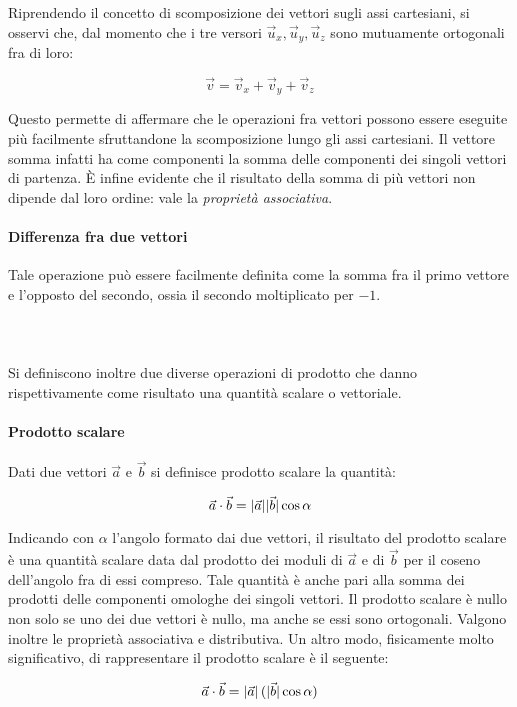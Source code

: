 Riprendendo il concetto di scomposizione dei vettori sugli assi cartesiani, si osservi che, dal momento che i tre versori $\vec{u}_x, \vec{u}_y, \vec{u}_z$ sono mutuamente ortogonali fra di loro:

\[
	\vec{v}=\vec{v}_x + \vec{v}_y + \vec{v}_z
\]

Questo permette di affermare che le operazioni fra vettori possono essere eseguite più facilmente sfruttandone la scomposizione lungo gli assi cartesiani. Il vettore somma infatti ha come componenti la somma delle componenti dei singoli vettori di partenza.
È infine evidente che il risultato della somma di più vettori non dipende dal loro ordine: vale la \emph{proprietà associativa}.

\paragraph{Differenza fra due vettori} Tale operazione può essere facilmente definita come la somma fra il primo vettore e l'opposto del secondo, ossia il secondo moltiplicato per $-1$.
\\
\\
\\
\\
Si definiscono inoltre due diverse operazioni di prodotto che danno rispettivamente come risultato una quantità scalare o vettoriale.

\paragraph{Prodotto scalare} Dati due vettori $\vec{a}$ e $\vec{b}$ si definisce prodotto scalare la quantità:

\[
	\vec{a}\cdot \vec{b}= \lvert\vec{a}\rvert\lvert\vec{b}\rvert\cos\alpha
\]

Indicando con $\alpha$ l'angolo formato dai due vettori, il risultato del prodotto scalare è una quantità scalare data dal prodotto dei moduli di $\vec{a}$ e di $\vec{b}$ per il coseno dell'angolo fra di essi compreso. Tale quantità è anche pari alla somma dei prodotti delle componenti omologhe dei singoli vettori. Il prodotto scalare è nullo non solo se uno dei due vettori è nullo, ma anche se essi sono ortogonali. Valgono inoltre le proprietà associativa e distributiva. Un altro modo, fisicamente molto significativo, di rappresentare il prodotto scalare è il seguente:

\[
	\vec{a}\cdot \vec{b}= \lvert\vec{a}\rvert\,(\lvert\vec{b}\rvert\cos\alpha)
\]

